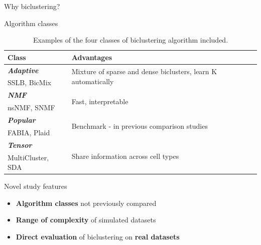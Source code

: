 \documentclass[xcolor=table,final]{beamer}
\newlength{\onecolwid}
\renewcommand{\bold}[1]{{\textcolor{norange}{\textbf{#1}}}}
\begin{document}
\begin{frame}[t]
\begin{columns}[t]
\begin{column}{\onecolwid}
\begin{block}{Why biclustering?}
\end{block}



\begin{block}{Algorithm classes}

\begin{table}[t!]
    \caption{Examples of the four classes of biclustering algorithm included.}

    \begin{tabular}{ l | l }
\textbf{Class} & \textbf{Advantages} \\ \hline
    \cellcolor[HTML]{C50F11}\color[HTML]{FFFFFF}\textbf{\textit{Adaptive}} & \multirow{2}{0.6 \textwidth}{Mixture of sparse and dense biclusters, learn K automatically} \\
    SSLB, BicMix & \\ \hline
    \cellcolor[HTML]{3B93DC}\color[HTML]{FFFFFF}\textbf{\textit{NMF}} & \multirow{2}{0.6 \textwidth}{Fast, interpretable} \\
    nsNMF, SNMF & \\ \hline
    \cellcolor[HTML]{50bd4c}\color[HTML]{FFFFFF}\textbf{\textit{Popular}} & \multirow{2}{0.6 \textwidth}{Benchmark - in previous comparison studies} \\
     FABIA, Plaid & \\ \hline
    \cellcolor[HTML]{7f1c8e}\color[HTML]{FFFFFF}\textbf{\textit{Tensor}} & \multirow{2}{0.6 \textwidth}{Share information across cell types} \\
    MultiCluster, SDA & \\ \hline
\end{tabular}
\end{table}

\end{block}




\begin{block}{Novel study features}

\begin{itemize}
    \item \bold{Algorithm classes} not previously compared
    \item \bold{Range of complexity} of simulated datasets
    \item \bold{Direct evaluation} of biclustering on \bold{real datasets}
\end{itemize}


\end{block}
\end{column}
\end{columns}
\end{frame}
\end{document}
